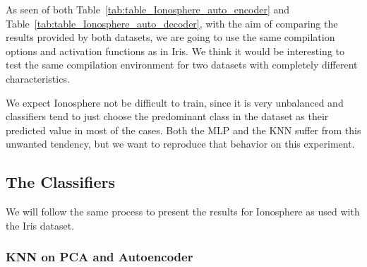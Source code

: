 As seen of both Table~\ref{tab:table_Ionosphere_auto_encoder} and Table~\ref{tab:table_Ionosphere_auto_decoder}, with the aim of  comparing the results provided by both datasets, we are going to use the same compilation options and activation functions as in Iris. We think it would be interesting to test the same compilation environment for two datasets with completely different characteristics.\par

We expect  Ionosphere  not be difficult to train, since it is very unbalanced and classifiers tend to just choose the predominant class in the dataset as their predicted value in most of the cases. Both the MLP and the KNN suffer from this unwanted tendency, but we want to reproduce that behavior on this experiment.

\subsection{The Classifiers}

We will follow the same process to present the results for  Ionosphere as used with the Iris dataset. 
%

\subsubsection{KNN on PCA and Autoencoder}


